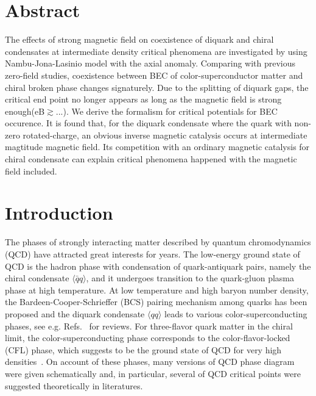 \documentclass[prd, showpacs,nofootinbib,amsmath,amssymb]{revtex4}
\begin{document}
\newcommand*{\rom}[1]{\expandafter\@slowromancap\romannumeral #1@}
\section{Abstract}
The effects of strong magnetic field on coexistence of diquark and chiral condensates at intermediate density critical phenomena are investigated by using Nambu-Jona-Lasinio model with the axial anomaly.
Comparing with previous zero-field studies,
coexistence between BEC of color-superconductor matter and chiral broken phase changes signaturely.
Due to the splitting of diquark gaps,
the critical end point no longer appears as long as the magnetic field is strong enough(eB$\gtrsim ...$).
We derive the formalism for critical potentials for BEC occurence.
It is found that,
for the diquark condensate where the quark with non-zero rotated-charge,
an obvious inverse magnetic catalysis occurs at intermediate magtitude magnetic field.
Its competition with an ordinary magnetic catalysis for chiral condensate  can explain
critical phenomena happened with the magnetic field included.

\section{Introduction}
The phases of strongly interacting matter described by quantum chromodynamics (QCD) have attracted great interests for years.
The low-energy ground state of QCD is the hadron phase with condensation of quark-antiquark pairs, namely the chiral condensate $\langle\bar{q}q\rangle$, and it undergoes transition to the quark-gluon plasma phase at high temperature.
At low temperature and high baryon number density, the Bardeen-Cooper-Schrieffer (BCS) pairing mechanism among quarks has been proposed and the diquark condensate $\langle qq\rangle$ leads to various color-superconducting phases, see e.g. Refs.~\cite{alford2004dense,buballa2005njl} for reviews.
For three-flavor quark matter in the chiral limit, the color-superconducting phase corresponds to the color-flavor-locked (CFL) phase, which suggests to be the ground state of QCD for very high densities~\cite{alford1998qcd}.
On account of these phases, many versions of QCD phase diagram were given schematically and, in particular, several of QCD critical points were suggested theoretically in literatures.
\end{document}
